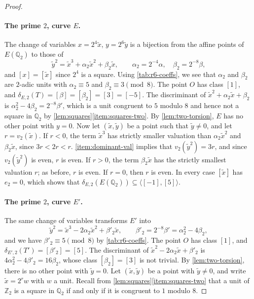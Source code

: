 \documentclass[12pt,oneside,openany]{book}
\theoremstyle{definition}
\theoremstyle{plain}
\numberwithin{equation}{chapter}
\theoremstyle{plain}
\theoremstyle{definition}
\theoremstyle{remark}
\newcommand{\Q}{\mathbb Q}
\newcommand{\Z}{\mathbb Z}
\newcommand{\sq}[1]{[#1]}
\begin{document}
\begin{proof}
\paragraph{The prime $2$, curve $E$.} The change of variables $x=2^4\tilde x$, $y=2^6\tilde y$ is a bijection from the affine points of $E(\Q_2)$ to those of
\[
\tilde y^2=\tilde x^3+\alpha_2\tilde x^2+\beta_2\tilde x,\qquad \alpha_2=2^{-4}\alpha,\quad \beta_2=2^{-8}\beta,
\]
and $\sq x=\sq{\tilde x}$ since $2^4$ is a square. Using \cref{tab:r6-coeffs}, we see that $\alpha_2$ and $\beta_2$ are $2$-adic units with $\alpha_2\equiv5$ and $\beta_2\equiv3\pmod8$. The point $O$ has class $\sq1$, and $\delta_{E,2}(T)=\sq\beta=\sq{\beta_2}=\sq3=\sq{-5}$. The discriminant of $\tilde x^2+\alpha_2\tilde x+\beta_2$ is $\alpha_2^2-4\beta_2=2^{-8}\beta'$, which is a unit congruent to $5$ modulo $8$ and hence not a square in $\Q_2$ by \cref{lem:squares}\ref{item:squares-two}. By \cref{lem:two-torsion}, $E$ has no other point with $y=0$. Now let $(\tilde x,\tilde y)$ be a point such that $\tilde y\ne0$, and let $r=v_2(\tilde x)$. If $r<0$, the term $\tilde x^3$ has strictly smaller valuation than $\alpha_2\tilde x^2$ and $\beta_2\tilde x$, since $3r<2r<r$. \ref{item:dominant-val} implies that $v_2(\tilde y^2)=3r$, and since $v_2(\tilde y^2)$ is even, $r$ is even. If $r>0$, the term $\beta_2\tilde x$ has the strictly smallest valuation $r$; as before, $r$ is even. If $r=0$, then $r$ is even. In every case $\sq{\tilde x}$ has $e_2=0$, which shows that $\delta_{E,2}(E(\Q_2))\subseteq\langle\sq{-1},\sq5\rangle$.

\paragraph{The prime $2$, curve $E'$.} The same change of variables transforms $E'$ into
\[
\tilde y^2=\tilde x^3-2\alpha_2\tilde x^2+\beta'_2\tilde x,\qquad \beta'_2=2^{-8}\beta'=\alpha_2^2-4\beta_2,
\]
and we have $\beta'_2\equiv5\pmod 8$ by \cref{tab:r6-coeffs}. The point $O$ has class $\sq1$, and $\delta_{E',2}(T')=\sq{\beta'_2}=\sq5$. The discriminant of $\tilde x^2-2\alpha_2\tilde x+\beta'_2$ is $4\alpha_2^2-4\beta'_2=16\beta_2$, whose class $\sq{\beta_2}=\sq3$ is not trivial. By \cref{lem:two-torsion}, there is no other point with $\tilde y=0$. Let $(\tilde x,\tilde y)$ be a point with $\tilde y\ne0$, and write $\tilde x=2^rw$ with $w$ a unit. Recall from \cref{lem:squares}\ref{item:squares-two} that a unit of $\Z_2$ is a square in $\Q_2$ if and only if it is congruent to $1$ modulo $8$.


\end{proof}
\end{document}
